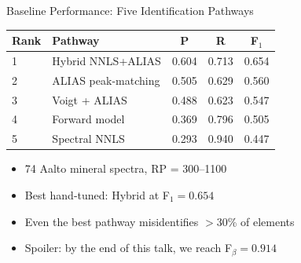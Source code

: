 \documentclass[aspectratio=169,12pt]{beamer}
\begin{document}
\begin{frame}{Baseline Performance: Five Identification Pathways}
  {\small
  \begin{table}
    \centering
    \begin{tabular}{@{}llccc@{}}
      \toprule
      Rank & Pathway & P & R & F$_1$ \\
      \midrule
      1 & Hybrid NNLS+ALIAS & 0.604 & 0.713 & \alert{0.654} \\
      2 & ALIAS peak-matching & 0.505 & 0.629 & 0.560 \\
      3 & Voigt + ALIAS & 0.488 & 0.623 & 0.547 \\
      4 & Forward model & 0.369 & 0.796 & 0.505 \\
      5 & Spectral NNLS & 0.293 & 0.940 & 0.447 \\
      \bottomrule
    \end{tabular}
  \end{table}
  }

  \vspace{0.3em}
  \begin{itemize}
    \item 74 Aalto mineral spectra, RP = 300--1100
    \item Best hand-tuned: Hybrid at F$_1 = 0.654$
    \item Even the best pathway misidentifies $>$30\% of elements
    \item \alert{Spoiler:} by the end of this talk, we reach \alert{F$_\beta = 0.914$}
  \end{itemize}
\end{frame}
\end{document}
